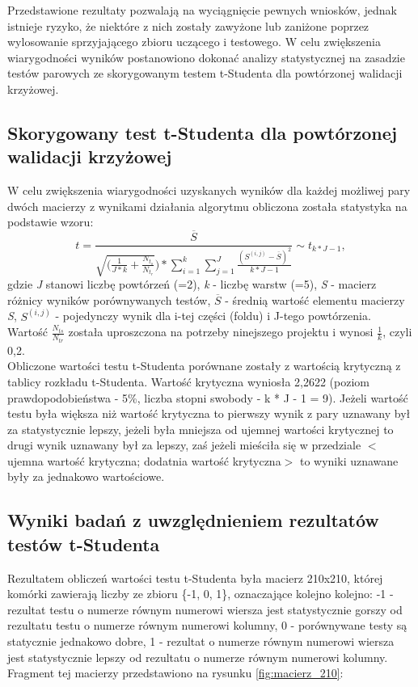 \documentclass{article}
\begin{document}
\newpage

Przedstawione rezultaty pozwalają na wyciągnięcie pewnych wniosków, jednak istnieje ryzyko, że niektóre z nich zostały zawyżone lub zaniżone poprzez wylosowanie sprzyjającego zbioru uczącego i testowego. W celu zwiększenia wiarygodności wyników postanowiono dokonać analizy statystycznej na zasadzie testów parowych ze skorygowanym testem t-Studenta dla powtórzonej walidacji krzyżowej.

\subsection{Skorygowany test t-Studenta dla powtórzonej walidacji krzyżowej}
W celu zwiększenia wiarygodności uzyskanych wyników dla każdej możliwej pary dwóch macierzy z wynikami działania algorytmu obliczona została statystyka na podstawie wzoru:
$$ t = \frac{\overline{S}}{\sqrt{(\frac{1}{J*k} + \frac{N_t_s}{N_t_r}})*\sum_{i=1}^k \sum_{j=1}^J \frac{(S^{(i,j)} - \overline{S})^2}{k*J-1}} \sim t_{k*J-1}, $$
gdzie \textit{J} stanowi liczbę powtórzeń (=2), \textit{k} - liczbę warstw (=5), \textit{S} - macierz różnicy wyników porównywanych testów, \textit{$\overline{S}$} - średnią wartość elementu macierzy \textit{S}, \textit{$S^{(i,j)}$} - pojedynczy wynik dla i-tej części (foldu) i J-tego powtórzenia. Wartość $\frac{N_{ts}}{N_{tr}}$ została uproszczona na potrzeby ninejszego projektu i wynosi $\frac{1}{k}$, czyli 0,2.\\
Obliczone wartości testu t-Studenta porównane zostały z wartością krytyczną z tablicy rozkładu t-Studenta. Wartość krytyczna wyniosła 2,2622 (poziom prawdopodobieństwa - 5\%, liczba stopni swobody - k * J - 1 = 9). Jeżeli wartość testu była większa niż wartość krytyczna to pierwszy wynik z pary uznawany był za statystycznie lepszy, jeżeli była mniejsza od ujemnej wartości krytycznej to drugi wynik uznawany był za lepszy, zaś jeżeli mieściła się w przedziale $<$ujemna wartość krytyczna; dodatnia wartość krytyczna$>$ to wyniki uznawane były za jednakowo wartościowe.

\subsection{Wyniki badań z uwzględnieniem rezultatów testów t-Studenta}
Rezultatem obliczeń wartości testu t-Studenta była macierz 210x210, której komórki zawierają liczby ze zbioru \{-1, 0, 1\}, oznaczające kolejno kolejno: -1 - rezultat testu o numerze równym numerowi wiersza jest statystycznie gorszy od rezultatu testu o numerze równym numerowi kolumny, 0 - porównywane testy są statycznie jednakowo dobre, 1 - rezultat o numerze równym numerowi wiersza jest statystycznie lepszy od rezultatu o numerze równym numerowi kolumny. Fragment tej macierzy przedstawiono na rysunku \ref{fig:macierz_210}:
\end{document}
